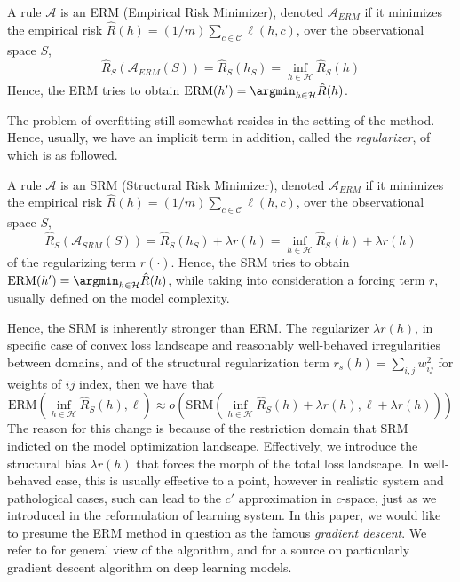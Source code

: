 \documentclass[10pt]{article} %
\begin{document}
\begin{definition}
    A rule $\mathcal{A}$ is an ERM (Empirical Risk Minimizer), denoted $\mathcal{A}_{ERM}$ if it minimizes the empirical risk $\hat{R}(h)=(1/m)\sum_{c\in\mathcal{C}}\ell(h,c)$, over the observational space $S$, 
    \begin{equation}
        \hat{R}_{S}(\mathcal{A}_{ERM}(S)) = \hat{R}_{S} (h_{S}) = \inf_{h\in\mathcal{H}} \hat{R}_{S}(h) 
    \end{equation}
    Hence, the ERM tries to obtain $\mathrm{ERM}(h') = \argmin_{h\in \mathcal{H}} \hat{R}(h)$. 
\end{definition}

The problem of overfitting still somewhat resides in the setting of the method. Hence, usually, we have an implicit term in addition, called the \textit{regularizer}, of which is as followed. 

\begin{definition}
    A rule $\mathcal{A}$ is an SRM (Structural Risk Minimizer), denoted $\mathcal{A}_{ERM}$ if it minimizes the empirical risk $\hat{R}(h)=(1/m)\sum_{c\in\mathcal{C}}\ell(h,c)$, over the observational space $S$, 
    \begin{equation}
        \hat{R}_{S}(\mathcal{A}_{SRM}(S)) = \hat{R}_{S} (h_{S}) + \lambda r(h)= \inf_{h\in\mathcal{H}} \hat{R}_{S}(h) + \lambda r(h)
    \end{equation}
    of the regularizing term $r(\cdot)$. Hence, the SRM tries to obtain $\mathrm{ERM}(h') = \argmin_{h\in \mathcal{H}} \hat{R}(h)$, while taking into consideration a forcing term $r$, usually defined on the model complexity. 
\end{definition}

Hence, the SRM is inherently stronger than ERM. The regularizer $\lambda r(h)$, in specific case of convex loss landscape and reasonably well-behaved irregularities between domains, and of the structural regularization term $r_{s}(h)=\sum_{i,j}w_{ij}^{2}$ for weights of $ij$ index, then we have that 
\begin{equation}
    \mathrm{ERM}\left(\inf_{h\in\mathcal{H}} \hat{R}_{S}(h), \ell\right) \approx o\left(\mathrm{SRM}\left(\inf_{h\in\mathcal{H}} \hat{R}_{S}(h) + \lambda r(h), \ell + \lambda r(h)\right)\right)
\end{equation}
The reason for this change is because of the restriction domain that $\mathrm{SRM}$ indicted on the model optimization landscape. Effectively, we introduce the structural bias $\lambda r(h)$ that forces the morph of the total loss landscape. In well-behaved case, this is usually effective to a point, however in realistic system and pathological cases, such can lead to the $c'$ approximation in $c$-space, just as we introduced in the reformulation of learning system. In this paper, we would like to presume the ERM method in question as the famous \textit{gradient descent}. We refer to \cite{achlioptas_stochastic_nodate,ruder_overview_2017} for general view of the algorithm, and \cite{zhang_gradient_2019} for a source on particularly gradient descent algorithm on deep learning models. 
\end{document}
